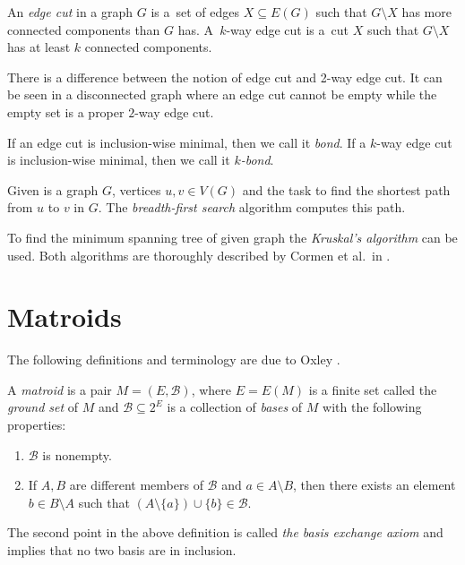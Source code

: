 An \textit{edge cut} in a graph $G$ is a~set of edges $X \subseteq E(G)$ such that $G \setminus X$ has more connected components than $G$ has. A~$k$-way edge cut is a~cut $X$ such that $G \setminus X$ has at least $k$ connected components.

\begin{note}
	There is a difference between the notion of edge cut and 2-way edge cut. It can be seen in a disconnected graph where an edge cut cannot be empty while the empty set is a proper $2$-way edge cut.
\end{note}

If an edge cut is inclusion-wise minimal, then we call it \textit{bond}. If a $k$-way edge cut is inclusion-wise minimal, then we call it \textit{$k$-bond}.

Given is a graph $G$, vertices $u, v \in V(G)$ and the task to find the shortest path from $u$ to $v$ in $G$. The \textit{breadth-first search} algorithm computes this path.

To find the minimum spanning tree of given graph the \textit{Kruskal's algorithm} can be used. Both algorithms are thoroughly described by Cormen et al.\ in \cite{clrs}.

\section{Matroids}
The following definitions and terminology are due to Oxley \cite{oxley2006matroid}.

\begin{defn}[Matroid]
	A \textit{matroid} is a pair $M = (E,\mathcal{B})$, where $E = E(M)$ is a finite set called the \textit{ground set} of $M$ and $\mathcal{B} \subseteq 2^{E}$ is a collection of \textit{bases} of $M$ with the following properties:
	\begin{enumerate}
		\item $\mathcal{B}$ is nonempty.
		\item If $A, B$ are different members of $\mathcal{B}$ and $a \in A \setminus B$, then there exists an element $b \in B \setminus A$ such that $(A \setminus \{a\}) \cup \{b\} \in \mathcal{B}$.
	\end{enumerate}
\end{defn}

\begin{rem}
The second point in the above definition is called \textit{the basis exchange axiom} and implies that no two basis are in inclusion.
\end{rem}

